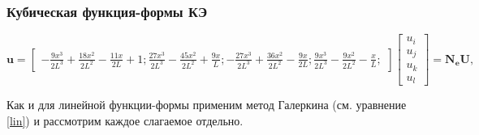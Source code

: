\subsubsection{Кубическая функция-формы КЭ}
$$
\mathbf{u}=\begin{bmatrix}
-\frac{9x^3}{2L^3}+\frac{18x^2}{2L^2}-\frac{11x}{2L} + 1;
\frac{27x^3}{2L^3}-\frac{45x^2}{2L^2}+\frac{9x}{L};
-\frac{27x^3}{2L^3}+\frac{36x^2}{2L^2}-\frac{9x}{2L};
\frac{9x^3}{2L^3}-\frac{9x^2}{2L^2}-\frac{x}{L};
\end{bmatrix}
\begin{bmatrix}
u_i \\
u_j\\
u_k\\
u_l
\end{bmatrix}
=\mathbf{N_eU},
$$

Как и для линейной функции-формы применим метод Галеркина (см. уравнение \ref{lin}) и рассмотрим каждое слагаемое отдельно.

